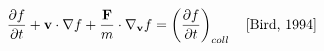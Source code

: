 \documentclass[preview]{standalone}
\begin{document}
\begin{align*}
\special{dvisvgm:raw <g id='unique000'>}\frac{\partial f}{\partial t} + \mathbf{v} \cdot \nabla f + \frac{\mathbf{F}}{m} \cdot \nabla_\mathbf{v} f = \left( \frac{\partial f}{\partial t} \right)_{coll} \quad \text{[Bird, 1994]}\special{dvisvgm:raw </g>}
\end{align*}
\end{document}
